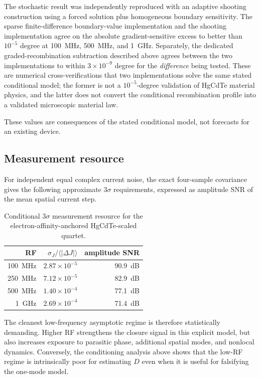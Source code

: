 \documentclass[11pt]{article}
\begin{document}
The stochastic result was independently reproduced with an adaptive shooting construction using a forced solution plus homogeneous boundary sensitivity. The sparse finite-difference boundary-value implementation and the shooting implementation agree on the absolute gradient-sensitive excess to better than $10^{-5}$ degree at \SI{100}{MHz}, \SI{500}{MHz}, and \SI{1}{GHz}. Separately, the dedicated graded-recombination subtraction described above agrees between the two implementations to within $3\times10^{-9}$ degree for the \emph{difference} being tested. These are numerical cross-verifications that two implementations solve the same stated conditional model; the former is not a $10^{-5}$-degree validation of HgCdTe material physics, and the latter does not convert the conditional recombination profile into a validated microscopic material law.

These values are consequences of the stated conditional model, not forecasts for an existing device.

\subsection{Measurement resource}

For independent equal complex current noise, the exact four-sample covariance gives the following approximate $3\sigma$ requirements, expressed as amplitude SNR of the mean spatial current step.
\begin{table}[H]
\centering
\caption{Conditional $3\sigma$ measurement resource for the electron-affinity-anchored HgCdTe-scaled quartet.}
\begin{tabular}{rrr}
\toprule
RF & $\sigma_J/\langle|\Delta J|\rangle$ & amplitude SNR \\
\midrule
\SI{100}{MHz} & $2.87\times10^{-5}$ & \SI{90.9}{dB} \\
\SI{250}{MHz} & $7.12\times10^{-5}$ & \SI{82.9}{dB} \\
\SI{500}{MHz} & $1.40\times10^{-4}$ & \SI{77.1}{dB} \\
\SI{1}{GHz} & $2.69\times10^{-4}$ & \SI{71.4}{dB} \\
\bottomrule
\end{tabular}
\end{table}
The cleanest low-frequency asymptotic regime is therefore statistically demanding. Higher RF strengthens the closure signal in this explicit model, but also increases exposure to parasitic phase, additional spatial modes, and nonlocal dynamics. Conversely, the conditioning analysis above shows that the low-RF regime is intrinsically poor for estimating $D$ even when it is useful for falsifying the one-mode model.
\end{document}
